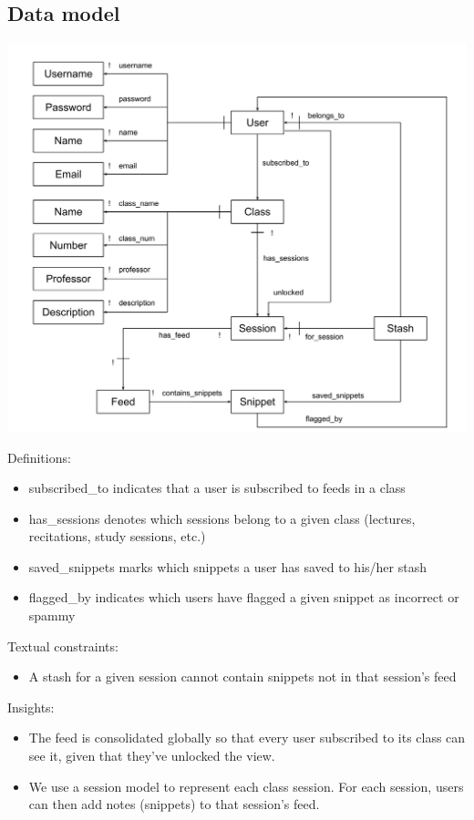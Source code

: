 \documentclass{article}
\begin{document}
\subsection*{Data model}
\begin{center}
\includegraphics[width=6in]{DataModel.png}
\end{center}

Definitions:
\begin{itemize}
\item subscribed\_to indicates that a user is subscribed to feeds in a class
\item has\_sessions denotes which sessions belong to a given class (lectures, recitations, study sessions, etc.)
\item saved\_snippets marks which snippets a user has saved to his/her stash
\item flagged\_by indicates which users have flagged a given snippet as incorrect or spammy
\end{itemize}

Textual constraints:
\begin{itemize}
\item A stash for a given session cannot contain snippets not in that session's feed
\end{itemize}

Insights:
\begin{itemize}
\item The feed is consolidated globally so that every user subscribed to its class can see it, given that they've unlocked the view. 
\item We use a session model to represent each class session. For each session, users can then add notes (snippets) to that session's feed. 
\end{itemize}
\end{document}
